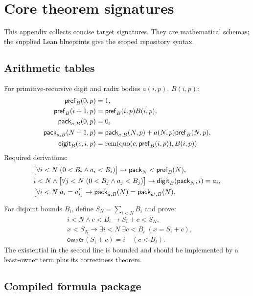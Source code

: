 \section{Core theorem signatures}

This appendix collects concise target signatures.  They are mathematical
schemas; the supplied Lean blueprints give the scoped repository syntax.

\subsection{Arithmetic tables}

For primitive-recursive digit and radix bodies \(a(i,p)\), \(B(i,p)\):
\begin{align*}
 \mathsf{pref}_B(0,p)&=1,\\
 \mathsf{pref}_B(i+1,p)&=\mathsf{pref}_B(i,p)B(i,p),\\
 \mathsf{pack}_{a,B}(0,p)&=0,\\
 \mathsf{pack}_{a,B}(N+1,p)&=\mathsf{pack}_{a,B}(N,p)+a(N,p)\mathsf{pref}_B(N,p),\\
 \mathsf{digit}_{B}(c,i,p)&=
   \operatorname{rem}(\operatorname{quo}(c,\mathsf{pref}_B(i,p)),B(i,p)).
\end{align*}
Required derivations:
\begin{align*}
 &\bigl[\forall i<N\;(0<B_i\wedge a_i<B_i)\bigr]
   \to \mathsf{pack}_N<\mathsf{pref}_B(N),\\
 &i<N\wedge\bigl[\forall j<N\;(0<B_j\wedge a_j<B_j)\bigr]
   \to \mathsf{digit}_B(\mathsf{pack}_N,i)=a_i,\\
 &\bigl[\forall i<N\;a_i=a'_i\bigr]
   \to \mathsf{pack}_{a,B}(N)=\mathsf{pack}_{a',B}(N).
\end{align*}

For disjoint bounds \(B_i\), define \(S_N=\sum_{i<N}B_i\) and prove:
\begin{align*}
 &i<N\wedge c<B_i\to S_i+c<S_N,\\
 &x<S_N\to \exists i<N\;\exists c<B_i\;(x=S_i+c),\\
 &\mathsf{owner}(S_i+c)=i\quad(c<B_i).
\end{align*}
The existential in the second line is bounded and should be implemented by a
least-owner term plus its correctness theorem.

\subsection{Compiled formula package}

